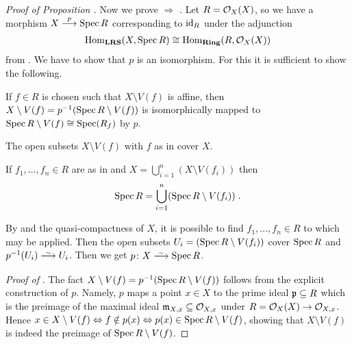 \documentclass[a4paper,parskip=half,numbers=enddot, DIV=12]{scrreprt}
\begin{document}
\begin{proof}[Proof of Proposition ]
Now we prove  $\Rightarrow$ . Let $R=\mathcal{O}_X(X)$, so we have a morphism $X\morphism[p]\Spec R$ corresponding to $\operatorname{id}_R$
under the adjunction
\begin{align*}
\Hom_{\cat{LRS}}(X,\Spec R) \cong \Hom_{\cat{Ring}}(R,\Oo_X(X))
\end{align*}
from \cite[Proposition~1.4.2]{alggeo1}. We have to show that $p$ is an isomorphism. For this it is sufficient to show the following.
\begin{alphanumerate}
	\item[\itememph{\alpha}] If $f\in R$ is chosen such that $X\setminus V(f)$ is affine, then $X\setminus V(f) = p^{-1}(\operatorname{Spec} R\setminus V(f))$
	is isomorphically mapped to $\operatorname{Spec} R\setminus V(f)\cong \operatorname{Spec}(R_f)$ by $p$.
	\item[\itememph{\beta}] The open subsets $X\setminus V(f)$ with $f$ as in \itememph{\alpha} cover $X$.
	\item[\itememph{\gamma}] If $f_1,\ldots,f_n \in R$ are as in \itememph{\alpha} and $X=\bigcup_{i=1}^n (X\setminus V(f_i))$ then
	\begin{align*}
		\operatorname{Spec} R = \bigcup_{i=1}^n (\operatorname{Spec} R\setminus V(f_i))\;.
	\end{align*}
\end{alphanumerate}
By \itememph{\beta} and the quasi-compactness of $X$, it is possible to find
$f_1,\ldots,f_n\in R$ to which \itememph{\gamma} may be applied. Then the open subsets
$U_i = (\operatorname{Spec} R\setminus V(f_i))$ cover $\operatorname{Spec} R$
and $p^{-1}(U_i) \isomorphism U_i$. Then we get
$p\colon X\isomorphism\Spec R$.

\emph{Proof of \itememph{\alpha}}.
The fact $X\setminus V(f)=p^{-1}(\operatorname{Spec} R\setminus V(f))$ follows from the explicit construction of $p$.
Namely, $p$ maps a point $x\in X$ to the prime ideal $\mathfrak{p} \subseteq R$ which is the preimage of the maximal ideal $\mathfrak{m}_{X,x}\subseteq \mathcal{O}_{X,x}$ under $R=\Oo_X(X)\morphism\Oo_{X,x}$.
Hence $x\in X\setminus V(f) \Leftrightarrow f \notin p(x) \Leftrightarrow p(x) \in \operatorname{Spec} R\setminus V(f)$, showing that $X\setminus V(f)$ is indeed the preimage of $\operatorname{Spec} R\setminus V(f)$.


\end{proof}
\end{document}
